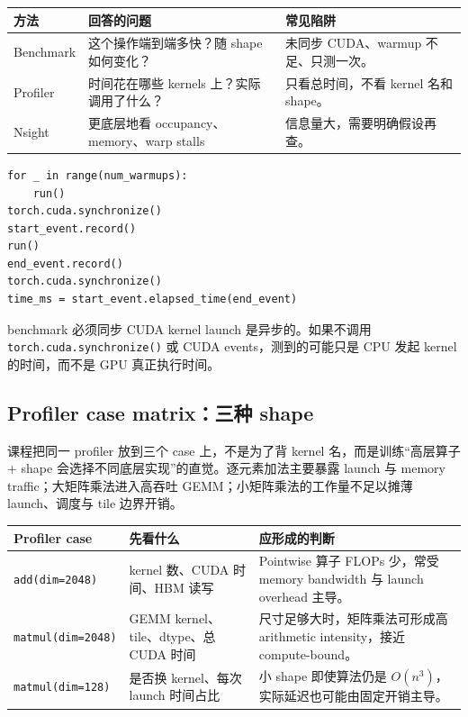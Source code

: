 \documentclass[a4paper]{article}
\begin{document}
\begin{longtable}{p{}p{}p{}}
\toprule\textbf{方法} & \textbf{回答的问题} & \textbf{常见陷阱} \\
\midrule
Benchmark & 这个操作端到端多快？随 shape 如何变化？ & 未同步 CUDA、warmup 不足、只测一次。 \\
Profiler & 时间花在哪些 kernels 上？实际调用了什么？ & 只看总时间，不看 kernel 名和 shape。 \\
Nsight & 更底层地看 occupancy、memory、warp stalls & 信息量大，需要明确假设再查。 \\
\bottomrule
\end{longtable}
\begin{lstlisting}[caption={CUDA event benchmark 的关键结构}]
for _ in range(num_warmups):
    run()
torch.cuda.synchronize()
start_event.record()
run()
end_event.record()
torch.cuda.synchronize()
time_ms = start_event.elapsed_time(end_event)
\end{lstlisting}
\begin{warningbox}{benchmark 必须同步}
CUDA kernel launch 是异步的。如果不调用 \texttt{torch.cuda.synchronize()} 或 CUDA events，测到的可能只是 CPU 发起 kernel 的时间，而不是 GPU 真正执行时间。
\end{warningbox}

\subsection{Profiler case matrix：三种 shape}

课程把同一 profiler 放到三个 case 上，不是为了背 kernel 名，而是训练“高层算子 + shape 会选择不同底层实现”的直觉。逐元素加法主要暴露 launch 与 memory traffic；大矩阵乘法进入高吞吐 GEMM；小矩阵乘法的工作量不足以摊薄 launch、调度与 tile 边界开销。

\begin{longtable}{p{}p{}p{}}
\toprule
\textbf{Profiler case} & \textbf{先看什么} & \textbf{应形成的判断} \\
\midrule
\texttt{add(dim=2048)} & kernel 数、CUDA 时间、HBM 读写 & Pointwise 算子 FLOPs 少，常受 memory bandwidth 与 launch overhead 主导。 \\
\texttt{matmul(dim=2048)} & GEMM kernel、tile、dtype、总 CUDA 时间 & 尺寸足够大时，矩阵乘法可形成高 arithmetic intensity，接近 compute-bound。 \\
\texttt{matmul(dim=128)} & 是否换 kernel、每次 launch 时间占比 & 小 shape 即使算法仍是 \(O(n^3)\)，实际延迟也可能由固定开销主导。 \\
\bottomrule
\end{longtable}
\end{document}
